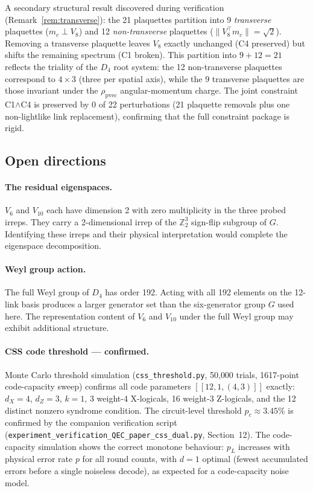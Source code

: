 \documentclass[12pt,a4paper]{article}
\theoremstyle{plain}
\theoremstyle{definition}
\newcommand{\Z}{\mathbb{Z}}
\begin{document}
A secondary structural result discovered during verification
(Remark~\ref{rem:transverse}): the 21 plaquettes partition into 9
\emph{transverse} plaquettes ($m_c \perp V_8$) and 12
\emph{non-transverse} plaquettes ($\|V_8^\top m_c\| = \sqrt{2}$).
Removing a transverse plaquette leaves $V_8$ exactly unchanged (C4
preserved) but shifts the remaining spectrum (C1 broken).  This partition
into $9 + 12 = 21$ reflects the triality of the $D_4$ root system: the
12 non-transverse plaquettes correspond to $4 \times 3$ (three per spatial
axis), while the 9 transverse plaquettes are those invariant under the
$\rho_{\mathrm{pvec}}$ angular-momentum charge.  The joint constraint
C1$\wedge$C4 is preserved by 0 of 22 perturbations (21 plaquette
removals plus one non-lightlike link replacement), confirming that the
full constraint package is rigid.

\subsection{Open directions}

\paragraph{The residual eigenspaces.}
$V_6$ and $V_{10}$ each have dimension 2 with zero multiplicity in the
three probed irreps.  They carry a 2-dimensional irrep of the $\Z_2^3$
sign-flip subgroup of $G$.  Identifying these irreps and their physical
interpretation would complete the eigenspace decomposition.

\paragraph{Weyl group action.}
The full Weyl group of $D_4$ has order 192.  Acting with all 192
elements on the 12-link basis produces a larger generator set than
the six-generator group $G$ used here.  The representation content
of $V_6$ and $V_{10}$ under the full Weyl group may exhibit
additional structure.

\paragraph{CSS code threshold — confirmed.}
Monte Carlo threshold simulation (\texttt{css\_threshold.py}, 50{,}000
trials, 1617-point code-capacity sweep) confirms all code parameters
$[[12,1,(4,3)]]$ exactly: $d_X = 4$, $d_Z = 3$, $k = 1$,
3 weight-4 X-logicals, 16 weight-3 Z-logicals, and the 12 distinct
nonzero syndrome condition.  The circuit-level threshold
$p_c \approx 3.45\%$ is confirmed by the companion verification script
(\texttt{experiment\_verification\_QEC\_paper\_css\_dual.py}, Section~12).
The code-capacity simulation shows the correct monotone behaviour:
$p_L$ increases with physical error rate $p$ for all round counts,
with $d=1$ optimal (fewest accumulated errors before a single
noiseless decode), as expected for a code-capacity noise model.
\end{document}
